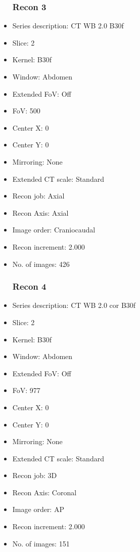 \documentclass[12pt]{article}
\begin{document}
\begin{itemize}
\subsubsection{Recon 3}
\item Series description: CT WB 2.0 B30f
\item Slice: 2
\item Kernel: B30f
\item Window: Abdomen
\item Extended FoV: Off
\item FoV: 500
\item Center X: 0
\item Center Y: 0
\item Mirroring: None
\item Extended CT scale: Standard
\item Recon job: Axial
\item Recon Axis: Axial
\item Image order: Craniocaudal
\item Recon increment: 2.000
\item No. of images: 426
\subsubsection{Recon 4}
\item Series description: CT WB 2.0 cor B30f
\item Slice: 2
\item Kernel: B30f
\item Window: Abdomen
\item Extended FoV: Off
\item FoV: 977
\item Center X: 0
\item Center Y: 0
\item Mirroring: None
\item Extended CT scale: Standard
\item Recon job: 3D
\item Recon Axis: Coronal
\item Image order: AP
\item Recon increment: 2.000
\item No. of images: 151

\end{itemize}
\end{document}
